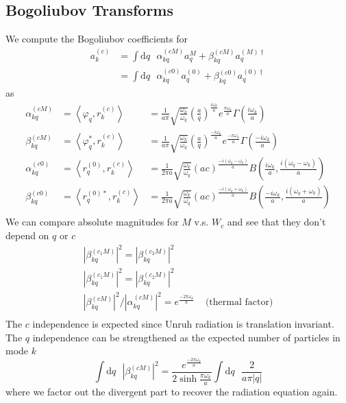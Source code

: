 \documentclass[12pt,a4paper]{article}
\newcommand{\dv}[1]{\mathrm{d} #1 \text{ }}
\begin{document}
\subsection{Bogoliubov Transforms}

We compute the Bogoliubov coefficients for
\begin{equation}
  \begin{array}{ll}
  a^{(c)}_k &= \int \dv{q} \alpha^{(cM)}_{kq} a^{M}_q + \beta^{(cM)}_{kq} a^{(M)\dagger}_q \\
  &= \int \dv{q} \alpha^{(c0)}_{kq} a^{(0)}_q + \beta^{(c0)}_{kq} a^{(0)\dagger}_q
  \end{array}
\end{equation}
as
\begin{equation}
  \begin{array}{ccl}
    \alpha^{(cM)}_{kq} &= \left<\varphi_q, r_k^{(c)} \right> &= \frac{1}{a \pi} \sqrt{\frac{\omega_k}{\omega_q}} \left(\frac{a}{q}\right)^{\frac{i\omega_k}{a}} e^{\frac{\pi \omega_k}{a}} \Gamma\left(\frac{i\omega_k}{a}\right) \\
    \beta^{(cM)}_{kq} &= \left<\varphi_q^*, r_k^{(c)} \right> &= \frac{1}{a \pi} \sqrt{\frac{\omega_k}{\omega_q}} \left(\frac{a}{q}\right)^{\frac{-i\omega_k}{a}} e^{\frac{-\pi \omega_k}{a}} \Gamma\left(\frac{-i\omega_k}{a}\right) \\
    \alpha^{(c0)}_{kq} &= \left<r_q^{(0)}, r_k^{(c)} \right> &= \frac{1}{2 \pi a}\sqrt{\frac{\omega_k}{\omega_q}} (ac)^{\frac{-i(\omega_q - \omega_k)}{a}} B\left(\frac{i\omega_k}{a}, \frac{i(\omega_q - \omega_k)}{a}\right) \\
    \beta^{(c0)}_{kq} &= \left<r_q^{(0)*}, r_k^{(c)} \right> &= \frac{1}{2 \pi a}\sqrt{\frac{\omega_k}{\omega_q}} (ac)^{\frac{-i(\omega_q + \omega_k)}{a}} B\left(\frac{-i\omega_k}{a}, \frac{i(\omega_q + \omega_k)}{a}\right) \\

  \end{array}
\end{equation}
We can compare absolute magnitudes for $M$ v.s. $W_c$ and see that they don't depend on $q$ or $c$
\begin{equation}
  \begin{array}{cc}
    \left|\beta_{kq}^{(c_1M)}\right|^2 = \left|\beta_{kq}^{(c_2M)}\right|^2 & \\
    \left|\beta_{kq}^{(c_1M)}\right|^2 = \left|\beta_{kq}^{(c_2M)}\right|^2 & \\
    \left|\beta_{kq}^{(cM)}\right|^2 / \left|\alpha_{kq}^{(cM)}\right|^2 = e^{\frac{-2\pi\omega_k}{a}}  & \text{   (thermal factor)} \\
 \end{array}
\end{equation}
The $c$ independence is expected since Unruh radiation is translation invariant. The $q$ independence can be strengthened as the expected number of particles in mode $k$
\begin{equation}
 \int \dv{q} \left|\beta_{kq}^{(cM)}\right|^2 = \frac{e^{\frac{-2 \pi \omega_k}{a}}}{2 \sinh \frac{\pi \omega_k}{a}} \int \dv{q} \frac{2}{a\pi |q|}
\end{equation}
where we factor out the divergent part to recover the radiation equation again.
\end{document}
